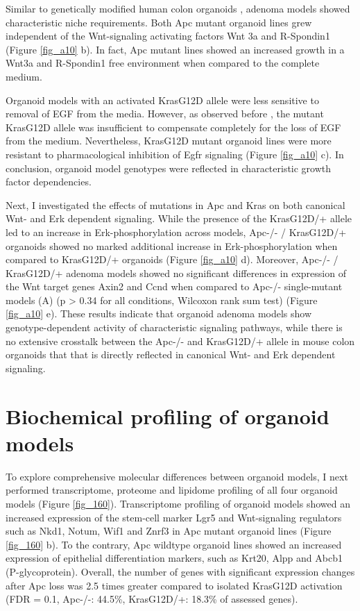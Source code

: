 \begin{flushleft}
Similar to genetically modified human colon organoids \cite{Drost2015-ph, Matano2015-zw}, adenoma models showed characteristic niche requirements. Both Apc mutant organoid lines grew independent of the Wnt-signaling activating factors Wnt 3a and R-Spondin1 (Figure \ref{fig_a10} b). In fact, Apc mutant lines showed an increased growth in a Wnt3a and R-Spondin1 free environment when compared to the complete medium. 

\smallbreak
Organoid models with an activated KrasG12D allele were less sensitive to removal of EGF from the media. However, as observed before \cite{Drost2015-ph}, the mutant KrasG12D allele was insufficient to compensate completely for the loss of EGF from the medium. Nevertheless, KrasG12D mutant organoid lines were more resistant to pharmacological inhibition of Egfr signaling (Figure \ref{fig_a10} c). In conclusion, organoid model genotypes were reflected in characteristic growth factor dependencies.

\smallbreak
Next, I investigated the effects of mutations in Apc and Kras on both canonical Wnt- and Erk dependent signaling. While the presence of the KrasG12D/+ allele led to an increase in Erk-phosphorylation across models, Apc-/- / KrasG12D/+ organoids showed no marked additional increase in Erk-phosphorylation when compared to KrasG12D/+ organoids (Figure \ref{fig_a10} d). Moreover, Apc-/- / KrasG12D/+ adenoma models showed no significant differences in expression of the Wnt target genes Axin2 and Ccnd when compared to Apc-/- single-mutant models (A) (p > 0.34 for all conditions, Wilcoxon rank sum test) (Figure \ref{fig_a10} e). These results indicate that organoid adenoma models show genotype-dependent activity of characteristic signaling pathways, while there is no extensive crosstalk between the Apc-/-  and KrasG12D/+ allele in mouse colon organoids that that is directly reflected in canonical Wnt- and Erk dependent signaling.  

\bigbreak
\section{Biochemical profiling of organoid models}
To explore comprehensive molecular differences between organoid models, I next performed transcriptome, proteome and lipidome profiling of all four organoid models (Figure \ref{fig_160}). Transcriptome profiling of organoid models showed an increased expression of the stem-cell marker Lgr5 and Wnt-signaling regulators such as Nkd1, Notum, Wif1 and Znrf3 in Apc mutant organoid lines (Figure \ref{fig_160} b). To the contrary, Apc wildtype organoid lines showed an increased expression of epithelial differentiation markers, such as Krt20, Alpp and Abcb1 (P-glycoprotein). Overall, the number of genes with significant expression changes after Apc loss was 2.5 times greater compared to isolated KrasG12D activation (FDR = 0.1, Apc-/-: 44.5\%, KrasG12D/+: 18.3\% of assessed genes). 


\end{flushleft}

